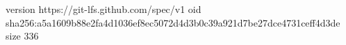 version https://git-lfs.github.com/spec/v1
oid sha256:a5a1609b88e2fa4d1036ef8ec5072d4d3b0c39a921d7be27dce4731ceff4d3de
size 336
